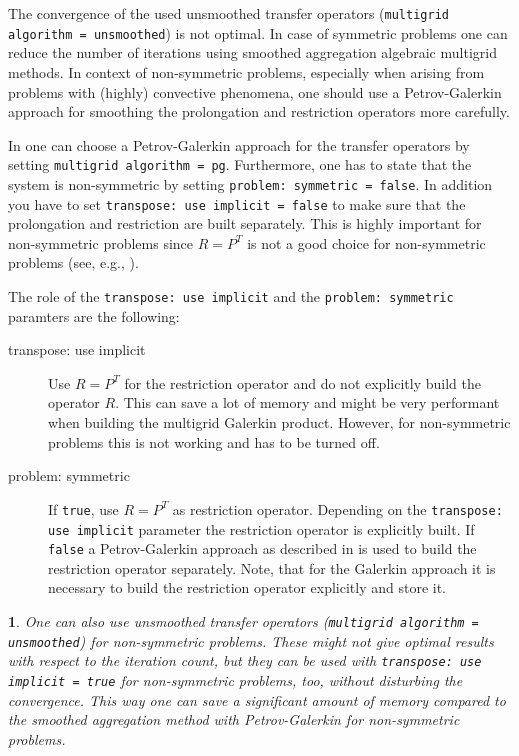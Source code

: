 \documentclass[10pt,fleqn]{book}
\newtheorem*{mycomment}{\ding{42}}
\begin{document}
The convergence of the used unsmoothed transfer operators (\texttt{multigrid algorithm = unsmoothed}) is not optimal. In case of symmetric problems one can reduce the number of iterations using smoothed aggregation algebraic multigrid methods. In context of non-symmetric problems, especially when arising from problems with (highly) convective phenomena, one should use a Petrov-Galerkin approach for smoothing the prolongation and restriction operators more carefully.

In \muelu one can choose a Petrov-Galerkin approach for the transfer operators by setting \texttt{multigrid algorithm = pg}. Furthermore, one has to state that the system is non-symmetric by setting \texttt{problem: symmetric = false}. In addition you have to set \texttt{transpose: use implicit = false} to make sure that the prolongation and restriction are built separately. This is highly important for non-symmetric problems since $R=P^T$ is not a good choice for non-symmetric problems (see, e.g., \cite{sala2008,wiesner2013}).

The role of the \texttt{transpose: use implicit} and the \texttt{problem: symmetric} paramters are the following:
\begin{description}
\item[transpose: use implicit] Use $R=P^T$ for the restriction operator and do not explicitly build the operator $R$. This can save a lot of memory and might be very performant when building the multigrid Galerkin product. However, for non-symmetric problems this is not working and has to be turned off.
\item[problem: symmetric] If \texttt{true}, use $R=P^T$ as restriction operator. Depending on the \texttt{transpose: use implicit} parameter the restriction operator is explicitly built. If \texttt{false} a Petrov-Galerkin approach as described in \cite{sala2008} is used to build the restriction operator separately. Note, that for the Galerkin approach it is necessary to build the restriction operator explicitly and store it.
\end{description}

\begin{mycomment}
One can also use unsmoothed transfer operators (\texttt{multigrid algorithm = unsmoothed}) for non-symmetric problems. These might not give optimal results with respect to the iteration count, but they can be used with \texttt{transpose: use implicit = true} for non-symmetric problems, too, without disturbing the convergence. This way one can save a significant amount of memory compared to the smoothed aggregation method with Petrov-Galerkin for non-symmetric problems.
\end{mycomment}
\end{document}
